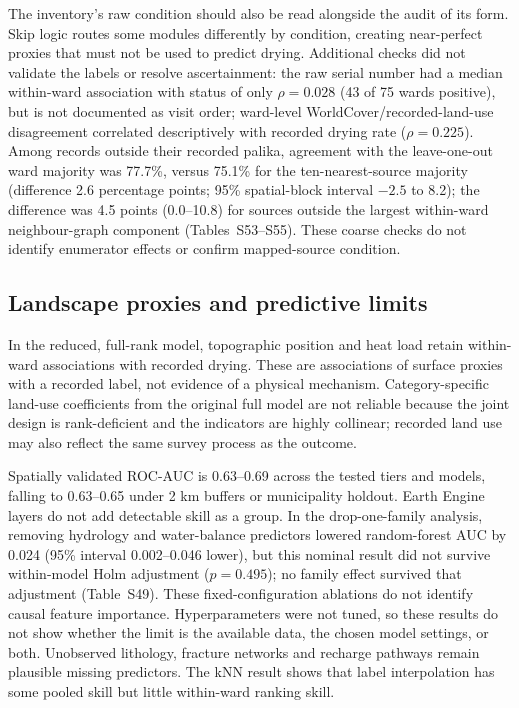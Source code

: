 \documentclass[preprint,12pt,authoryear]{elsarticle}
\newcommand{\auc}{ROC-AUC}
\begin{document}
The inventory's raw condition should also be read alongside the audit of its form. Skip logic routes some modules differently by condition, creating near-perfect proxies that must not be used to predict drying. Additional checks did not validate the labels or resolve ascertainment: the raw serial number had a median within-ward association with status of only $\rho = 0.028$ (43 of 75 wards positive), but is not documented as visit order; ward-level WorldCover/recorded-land-use disagreement correlated descriptively with recorded drying rate ($\rho = 0.225$). Among records outside their recorded palika, agreement with the leave-one-out ward majority was 77.7\%, versus 75.1\% for the ten-nearest-source majority (difference 2.6 percentage points; 95\% spatial-block interval $-2.5$ to 8.2); the difference was 4.5 points (0.0--10.8) for sources outside the largest within-ward neighbour-graph component (Tables~S53--S55). These coarse checks do not identify enumerator effects or confirm mapped-source condition.

\subsection{Landscape proxies and predictive limits}
In the reduced, full-rank model, topographic position and heat load retain within-ward associations with recorded drying. These are associations of surface proxies with a recorded label, not evidence of a physical mechanism. Category-specific land-use coefficients from the original full model are not reliable because the joint design is rank-deficient and the indicators are highly collinear; recorded land use may also reflect the same survey process as the outcome.

Spatially validated \auc{} is 0.63--0.69 across the tested tiers and models, falling to 0.63--0.65 under 2 km buffers or municipality holdout. Earth Engine layers do not add detectable skill as a group. In the drop-one-family analysis, removing hydrology and water-balance predictors lowered random-forest AUC by 0.024 (95\% interval 0.002--0.046 lower), but this nominal result did not survive within-model Holm adjustment ($p = 0.495$); no family effect survived that adjustment (Table~S49). These fixed-configuration ablations do not identify causal feature importance. Hyperparameters were not tuned, so these results do not show whether the limit is the available data, the chosen model settings, or both. Unobserved lithology, fracture networks and recharge pathways remain plausible missing predictors. The kNN result shows that label interpolation has some pooled skill but little within-ward ranking skill.
\end{document}
